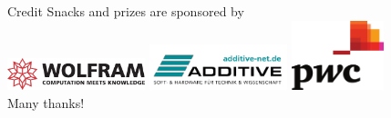 \documentclass{beamer}
\begin{document}
\begin{frame}{Credit}
  Snacks and prizes are sponsored by\\

  \center
  \includegraphics[width=0.3\textwidth]{media/wolfram.png} \hspace{0.5cm}
 \includegraphics[width=0.3\textwidth]{media/additive.png} \hspace{0.5cm}
 \includegraphics[width=0.2\textwidth]{media/PwC.png} \\
 \vspace{2cm}
 \Large{Many thanks!}

\end{frame}
\end{document}
